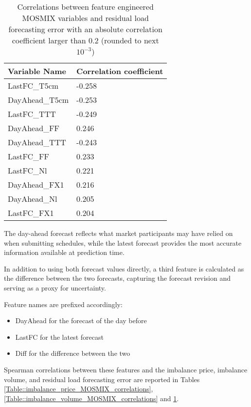 \documentclass[class=scrbook, crop=false]{standalone}
\begin{document}
    
    \begin{table}[h]
    \centering
    \begin{tabular}{l|l}
    Variable Name	& Correlation coefficient \\\hline
	LastFC\_T5cm                        &-0.258\\
	DayAhead\_T5cm                      &-0.253\\
	LastFC\_TTT                         &-0.249\\
	DayAhead\_FF                         &0.246\\
	DayAhead\_TTT                       &-0.243\\
	LastFC\_FF                           &0.233\\
	LastFC\_Nl                           &0.221\\
	DayAhead\_FX1                        &0.216\\
	DayAhead\_Nl                         &0.205\\
	LastFC\_FX1                          &0.204\\
    \end{tabular}
    
    \caption{Correlations between feature engineered MOSMIX variables and residual load forecasting error with an absolute correlation coefficient larger than $0.2$ (rounded to next $10^{-3}$)}
    \label{Table::residual_load_fce_MOSMIX_correlations}
    \end{table}

The day-ahead forecast reflects what market participants may have relied on when submitting schedules, while the latest forecast provides the most accurate information available at prediction time.

In addition to using both forecast values directly, a third feature is calculated as the difference between the two forecasts, capturing the forecast revision and serving as a proxy for uncertainty.

Feature names are prefixed accordingly:
\begin{itemize}
\item DayAhead for the forecast of the day before
\item LastFC for the latest forecast
\item Diff  for the difference between the two
\end{itemize}
Spearman correlations between these features and the imbalance price, imbalance volume, and residual load forecasting error are reported in Tables \ref{Table::imbalance_price_MOSMIX_correlations},  \ref{Table::imbalance_volume_MOSMIX_correlations} and  \ref{Table::residual_load_fce_MOSMIX_correlations}.
\end{document}
